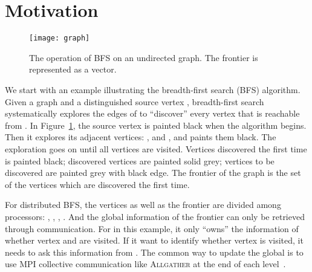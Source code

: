 \documentclass[conference]{IEEEtran}
\begin{document}
\section{Motivation}
\label{sec:pre}

\begin{figure}[t]
  \centering
  \texttt{[image: graph]}
  \caption{The operation of BFS on an undirected graph. The frontier  is
    represented as a vector.}
  \label{fig:bfs-example-all}
\end{figure}
We start with an example illustrating the breadth-first search (BFS)
algorithm. Given a graph  and a distinguished source vertex ,
breadth-first search systematically explores the edges of  to ``discover''
every vertex that is reachable from . In Figure~\ref{fig:bfs-example-all},
the source vertex  is painted black when the algorithm begins. Then it
explores its adjacent vertices: ,  and , and paints them black. The
exploration goes on until all vertices are visited. Vertices discovered the
first time is painted black; discovered vertices are painted solid grey;
vertices to be discovered are painted grey with black edge. The frontier 
of the graph is the set of the vertices which are discovered the first time.

For distributed BFS, the vertices as well as the frontier are divided among
processors: , , , . And
the global information of the frontier can only be retrieved through
communication. For  in this example, it only ``owns'' the information of
whether vertex  and  are visited. If it want to identify whether vertex
 is visited, it needs to ask this information from . The common way to
update the global  is to use MPI collective communication like
\textsc{Allgather} at the end of each
level~\cite{Yoo:2005,Buluc:2011,graph500}.
\end{document}

